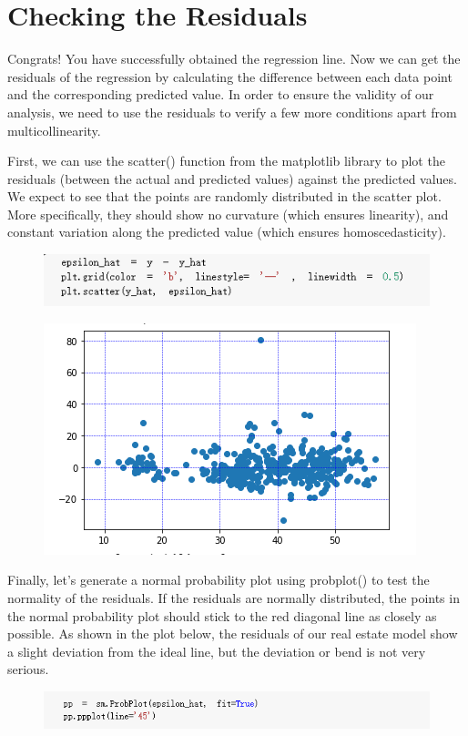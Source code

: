 \documentclass{article}
\begin{document}
\section*{Checking the Residuals}
Congrats! You have successfully obtained the regression line. Now we can get the residuals of the regression by calculating the difference between each data point and the corresponding predicted value. In order to ensure the validity of our analysis, we need to use the residuals to verify a few more conditions apart from multicollinearity.

First, we can use the scatter() function from the matplotlib library to plot the residuals (between the actual and predicted values) against the predicted values. We expect to see that the points are randomly distributed in the scatter plot. More specifically, they should show no curvature (which ensures linearity), and constant variation along the predicted value (which ensures homoscedasticity).
\begin{figure}[H]\centering\includegraphics[width=0.9\linewidth]{19}\end{figure}
\begin{figure}[H]\centering\includegraphics[width=0.6\linewidth]{20}\end{figure}
Finally, let's generate a normal probability plot using probplot() to test the normality of the residuals. If the residuals are normally distributed, the points in the normal probability plot should stick to the red diagonal line as closely as possible. As shown in the plot below, the residuals of our real estate model show a slight deviation from the ideal line, but the deviation or bend is not very serious.
\begin{figure}[H]\centering\includegraphics[width=\linewidth]{21}\end{figure}
\end{document}

